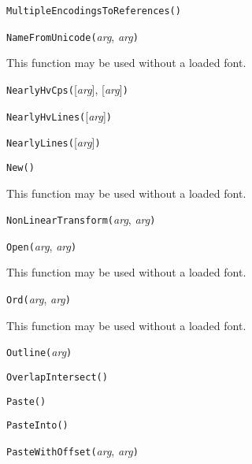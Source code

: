 
\noindent\texttt{MultipleEncodingsToReferences(}\texttt{)}


\noindent\texttt{NameFromUnicode(}\textit{arg}, \textit{arg}\texttt{)}

This function may be used without a loaded font.


\noindent\texttt{NearlyHvCps(}[\textit{arg}], [\textit{arg}]\texttt{)}


\noindent\texttt{NearlyHvLines(}[\textit{arg}]\texttt{)}


\noindent\texttt{NearlyLines(}[\textit{arg}]\texttt{)}


\noindent\texttt{New(}\texttt{)}

This function may be used without a loaded font.


\noindent\texttt{NonLinearTransform(}\textit{arg}, \textit{arg}\texttt{)}


\noindent\texttt{Open(}\textit{arg}, \textit{arg}\texttt{)}

This function may be used without a loaded font.


\noindent\texttt{Ord(}\textit{arg}, \textit{arg}\texttt{)}

This function may be used without a loaded font.


\noindent\texttt{Outline(}\textit{arg}\texttt{)}


\noindent\texttt{OverlapIntersect(}\texttt{)}


\noindent\texttt{Paste(}\texttt{)}


\noindent\texttt{PasteInto(}\texttt{)}


\noindent\texttt{PasteWithOffset(}\textit{arg}, \textit{arg}\texttt{)}

